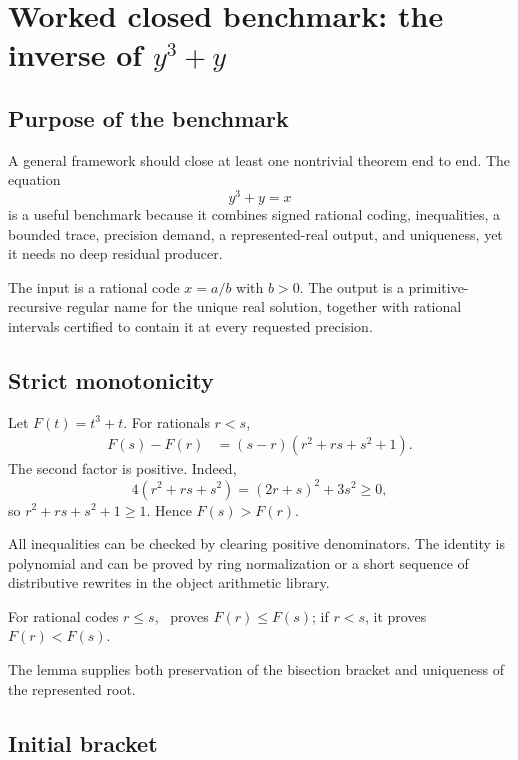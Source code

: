 \section{Worked closed benchmark: the inverse of \(y^3+y\)}

\subsection{Purpose of the benchmark}

A general framework should close at least one nontrivial theorem end to end.  The equation
\begin{equation}\label{eq:cubic-equation}
 y^3+y=x
\end{equation}
is a useful benchmark because it combines signed rational coding, inequalities, a bounded trace, precision demand, a represented-real output, and uniqueness, yet it needs no deep residual producer.

The input is a rational code \(x=a/b\) with \(b>0\).  The output is a primitive-recursive regular name for the unique real solution, together with rational intervals certified to contain it at every requested precision.

\subsection{Strict monotonicity}

Let \(F(t)=t^3+t\).  For rationals \(r<s\),
\begin{align*}
 F(s)-F(r)
 &= (s-r)(r^2+rs+s^2+1).
\end{align*}
The second factor is positive.  Indeed,
\[
 4(r^2+rs+s^2)=(2r+s)^2+3s^2\ge0,
\]
so \(r^2+rs+s^2+1\ge1\).  Hence \(F(s)>F(r)\).

All inequalities can be checked by clearing positive denominators.  The identity is polynomial and can be proved by ring normalization or a short sequence of distributive rewrites in the object arithmetic library.

\begin{lemma}\label{lem:cubic-monotone}
For rational codes \(r\le s\), \iPRA\ proves \(F(r)\le F(s)\); if \(r<s\), it proves \(F(r)<F(s)\).
\end{lemma}

The lemma supplies both preservation of the bisection bracket and uniqueness of the represented root.

\subsection{Initial bracket}

